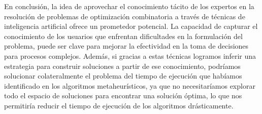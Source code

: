 En conclusión, la idea de aprovechar el conocimiento tácito de los expertos en la resolución de problemas de 
optimización combinatoria a través de técnicas de inteligencia artificial ofrece un prometedor potencial. La 
capacidad de capturar el conocimiento de los usuarios que enfrentan dificultades en la formulación
del problema, puede ser clave para mejorar la efectividad en la toma de decisiones para procesos complejos. Además,
si gracias a estas técnicas logramos inferir una estrategia para construir soluciones a partir de ese conocimiento,
podríamos solucionar colateralmente el problema del tiempo de ejecución que habíamos identificado en los algoritmos 
metaheurísticos, ya que no necesitaríamos explorar todo el espacio de soluciones para encontrar una solución óptima,
lo que nos permitiría reducir el tiempo de ejecución de los algoritmos drásticamente.



\pagebreak